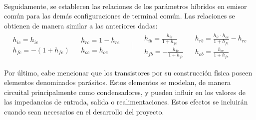 \paragraph{}
Seguidamente, se establecen las relaciones de los parámetros híbridos en emisor com\'un para las demás configuraciones de terminal común. Las relaciones se obtienen de manera similar a las anteriores dadas:
\[
\begin{array}{rrcll} 
      \begin{array}{l}
	 h_{ic} = h_{ie} \\
	 h_{fc} = - (1+ h_{fe} )
      \end{array}
      &
      \begin{array}{l}
	 h_{rc} = 1 - h_{re} \\
	 h_{oc} = h_{oe}
      \end{array}
      &
      \begin{array}{l}
	 \bigg|
      \end{array}
      &
      \begin{array}{l}
	 h_{ib} = \frac{h_{ie}}{1+h_{fe}} \\
	 h_{fb} = -\frac{h_{fe}}{1+h_{fe}} 
      \end{array}
      &
      \begin{array}{l}
	 h_{rb} = \frac{h_{ie} \cdot h_{oe}}{1+h_{fe}} - h_{re}\\
	 h_{ob} = \frac{h_{oe}}{1+h_{fe}} 
      \end{array}
\end{array}
\]

Por último, cabe mencionar que los transistores por su construcción física poseen elementos denominados parásitos. Estos elementos se modelan, de manera circuital principalmente como condensadores, y pueden influir en los valores de las impedancias de entrada, salida o realimentaciones. Estos efectos se incluirán cuando sean necesarios en el desarrollo del proyecto.
